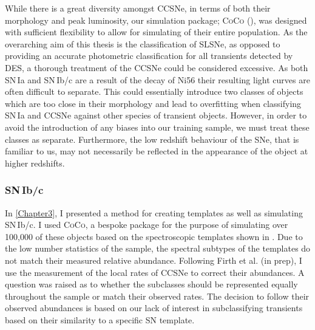 While there is a great diversity amongst CCSNe, in terms of both their morphology and peak luminosity, our simulation package; \textsc{CoCo} (), was designed with sufficient flexibility to allow for simulating of their entire population. As the overarching aim of this thesis is the classification of SLSNe, as opposed to providing an accurate photometric classification for all transients detected by DES, a thorough treatment of the CCSNe could be considered excessive. As both SN\,Ia and SN\,Ib/c are a result of the decay of Ni56 their resulting light curves are often difficult to separate. This could essentially introduce two classes of objects which are too close in their morphology and lead to overfitting when classifying SN\,Ia and CCSNe against other species of transient objects. However, in order to avoid the introduction of any biases into our training sample, we must treat these classes as separate. Furthermore, the low redshift behaviour of the SNe, that is familiar to us, may not necessarily be reflected in the appearance of the object at higher redshifts.

\subsubsection{SN\,Ib/c}
In \cref{Chapter3}, I presented a method for creating templates as well as simulating SN\,Ib/c. I used \textsc{CoCo}, a bespoke package for the purpose of simulating over 100,000 of these objects based on the spectroscopic templates shown in . Due to the low number statistics of the sample, the spectral subtypes of the templates do not match their measured relative abundance. Following Firth et al. (in prep), I use the \citet{Li2011} measurement of the local rates of CCSNe to correct their abundances. A question was raised as to whether the subclasses should be represented equally throughout the sample or match their observed rates. The decision to follow their observed abundances is based on our lack of interest in subclassifying transients based on their similarity to a specific SN template.

